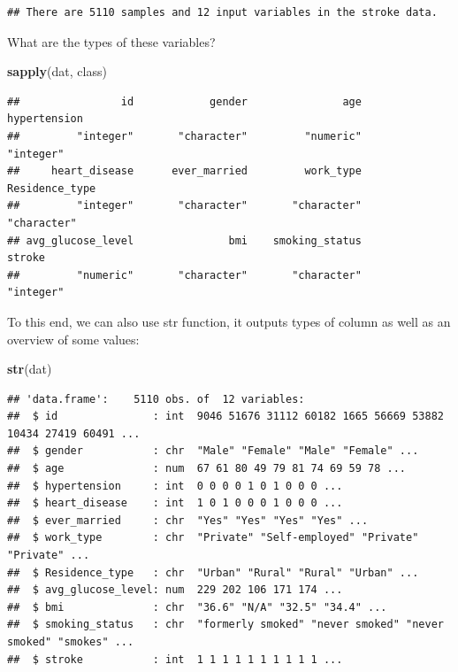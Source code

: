 \documentclass[
]{article}
\newenvironment{Shaded}{\begin{snugshade}}{\end{snugshade}}
\newcommand{\FunctionTok}[1]{\textcolor[rgb]{0.13,0.29,0.53}{\textbf{#1}}}
\newcommand{\NormalTok}[1]{#1}
\begin{document}
\begin{verbatim}
## There are 5110 samples and 12 input variables in the stroke data.
\end{verbatim}

What are the types of these variables?

\begin{Shaded}
\begin{Highlighting}[]
\FunctionTok{sapply}\NormalTok{(dat, class)}
\end{Highlighting}
\end{Shaded}

\begin{verbatim}
##                id            gender               age      hypertension 
##         "integer"       "character"         "numeric"         "integer" 
##     heart_disease      ever_married         work_type    Residence_type 
##         "integer"       "character"       "character"       "character" 
## avg_glucose_level               bmi    smoking_status            stroke 
##         "numeric"       "character"       "character"         "integer"
\end{verbatim}

To this end, we can also use str function, it outputs types of column as
well as an overview of some values:

\begin{Shaded}
\begin{Highlighting}[]
\FunctionTok{str}\NormalTok{(dat)}
\end{Highlighting}
\end{Shaded}

\begin{verbatim}
## 'data.frame':    5110 obs. of  12 variables:
##  $ id               : int  9046 51676 31112 60182 1665 56669 53882 10434 27419 60491 ...
##  $ gender           : chr  "Male" "Female" "Male" "Female" ...
##  $ age              : num  67 61 80 49 79 81 74 69 59 78 ...
##  $ hypertension     : int  0 0 0 0 1 0 1 0 0 0 ...
##  $ heart_disease    : int  1 0 1 0 0 0 1 0 0 0 ...
##  $ ever_married     : chr  "Yes" "Yes" "Yes" "Yes" ...
##  $ work_type        : chr  "Private" "Self-employed" "Private" "Private" ...
##  $ Residence_type   : chr  "Urban" "Rural" "Rural" "Urban" ...
##  $ avg_glucose_level: num  229 202 106 171 174 ...
##  $ bmi              : chr  "36.6" "N/A" "32.5" "34.4" ...
##  $ smoking_status   : chr  "formerly smoked" "never smoked" "never smoked" "smokes" ...
##  $ stroke           : int  1 1 1 1 1 1 1 1 1 1 ...
\end{verbatim}
\end{document}
